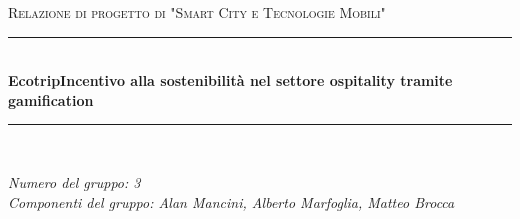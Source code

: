 \documentclass[12pt]{article}
\begin{document}

\begin{titlepage}

\newcommand{\HRule}{\rule{\linewidth}{0.5mm}}

\center

\textsc{\Large Relazione di progetto di "Smart City e Tecnologie Mobili"}\\[0.5cm]

\HRule \\[0.4cm]
{ \huge \bfseries Ecotrip\break\break\large Incentivo alla sostenibilità nel settore ospitality tramite gamification}\\[0.4cm]
\HRule \\[1.5cm]

\vfill

\begin{flushleft}
\emph{Numero del gruppo: 3}\\[1cm]
\emph{Componenti del gruppo: Alan Mancini, Alberto Marfoglia, Matteo Brocca}\\[3cm]
\end{flushleft}



\end{titlepage}


\tableofcontents

\newpage

 









%
%
\end{document}
